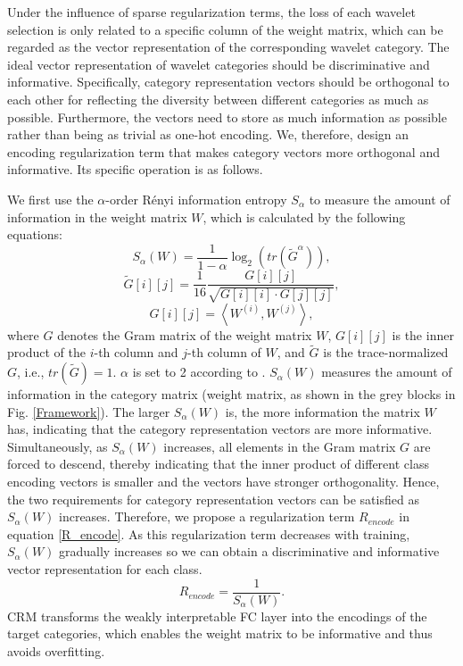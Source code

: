 \documentclass[letterpaper]{article} %
\begin{document}
	
	Under the influence of sparse regularization terms, the loss of each wavelet selection is only related to a specific column of the weight matrix, which can be regarded as the vector representation of the corresponding wavelet category. The ideal vector representation of wavelet categories should be discriminative and informative. Specifically, category representation vectors should be orthogonal to each other for reflecting the diversity between different categories as much as possible. Furthermore, the vectors need to store as much information as possible rather than being as trivial as one-hot encoding.
	We, therefore, design an encoding regularization term that makes category vectors more orthogonal and informative. Its specific operation is as follows.
	
	We first use the $\alpha$-order Rényi information entropy $S_\alpha$ to measure the amount of information in the weight matrix $W$, which is calculated by the following equations:
	\begin{equation}
		\label{S_alpha}
		{S_\alpha }(W) = \frac{1}{{1 - \alpha }}{\log _2}(tr({\tilde G^\alpha })),
	\end{equation}
	\begin{equation}
		\label{G tilde}
		\tilde G[i][j] = \frac{1}{{16}}\frac{{G[i][j]}}{{\sqrt {G[i][i] \cdot G[j][j]} }},
	\end{equation}
	\begin{equation}
		\label{G}
		G[i][j] = \left\langle {{W^{(i)}},{W^{(j)}}} \right\rangle,
	\end{equation}
	where $G$ denotes the Gram matrix of the weight matrix $W$, $G[i][j]$ is the inner product of the $i$-th column and $j$-th column of $W$, and $\tilde G$ is the trace-normalized $G$, i.e., $tr(\tilde G)=1$. $\alpha$ is set to 2 according to \cite{8787866, 8998186}.
	${S_\alpha}(W)$ measures the amount of information in the category matrix (weight matrix, as shown in the grey blocks in Fig. \ref{Framework}). The larger ${S_\alpha}(W)$ is, the more information the matrix $W$ has, indicating that the category representation vectors are more informative. Simultaneously, as ${S_\alpha}(W)$ increases, all elements in the Gram matrix $G$ are forced to descend, thereby indicating that the inner product of different class encoding vectors is smaller and the vectors have stronger orthogonality. Hence, the two requirements for category representation vectors can be satisfied as ${S_\alpha}(W)$ increases. Therefore, we propose a regularization term $R_{encode}$ in equation \ref{R_encode}. As this regularization term decreases with training, ${S_\alpha}(W)$ gradually increases so we can obtain a discriminative and informative vector representation for each class.
	\begin{equation}
		\label{R_encode}
		{R_{encode}} = \frac{1}{{{S_\alpha}(W)}}.
	\end{equation}
	CRM transforms the weakly interpretable FC layer into the encodings of the target categories, which enables the weight matrix to be informative and thus avoids overfitting.
	
\end{document}
